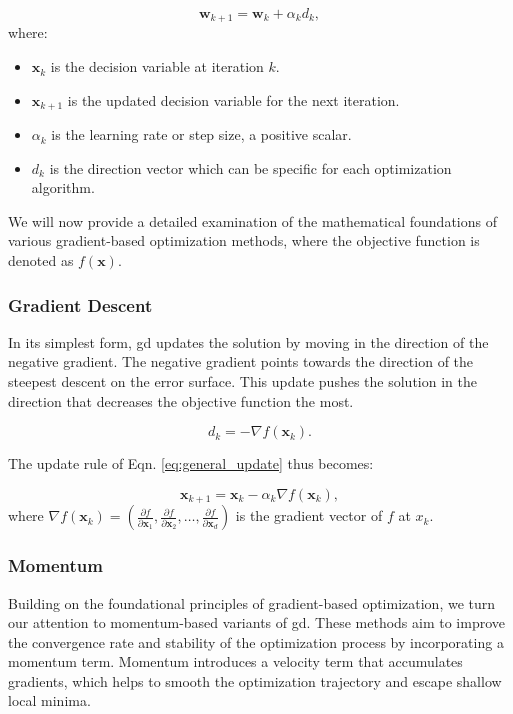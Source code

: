 \begin{equation}
\mathbf{w}_{k+1} = \mathbf{w}_k + \alpha_k d_k,
\label{eq:general_update}
\end{equation}
where:
\begin{itemize}
    \item $\mathbf{x}_k$ is the decision variable at iteration $k$.
    \item $\mathbf{x}_{k+1}$ is the updated decision variable for the next iteration.
    \item $\alpha_k$ is the learning rate or step size, a positive scalar.
    \item $d_k$ is the direction vector which can be specific for each optimization algorithm.
\end{itemize}

\noindent 
We will now provide a detailed examination of the mathematical foundations of various gradient-based optimization methods, where the objective function is denoted as $f(\mathbf{x})$.

\subsubsection{Gradient Descent}
\label{subsubsection:gradient_descent}

\noindent In its simplest form, \ac{gd} updates the solution by moving in the direction of the negative gradient. The negative gradient points towards the direction of the steepest descent on the error surface. This update pushes the solution in the direction that decreases the objective function the most.

\begin{equation*}
d_k = -\nabla f(\mathbf{x}_k).
\end{equation*}

\noindent The update rule of Eqn. \eqref{eq:general_update} thus becomes:

\begin{equation*}
\mathbf{x}_{k+1} = \mathbf{x}_k - \alpha_k \nabla f(\mathbf{x}_k),
\label{eq:gd_update}
\end{equation*}
where $\nabla f(\mathbf{x}_k) = \left(\frac{\partial f}{\partial \mathbf{x}_1}, \frac{\partial f}{\partial \mathbf{x}_2}, \dots, \frac{\partial f}{\partial \mathbf{x}_d} \right)$ is the gradient vector of $f$ at $x_k$.




\subsubsection{Momentum}
\label{subsubsection:momentum}
Building on the foundational principles of gradient-based optimization, we turn our attention to momentum-based variants of \ac{gd}. These methods aim to improve the convergence rate and stability of the optimization process by incorporating a momentum term.
Momentum introduces a velocity term that accumulates gradients, which helps to smooth the optimization trajectory and escape shallow local minima.

